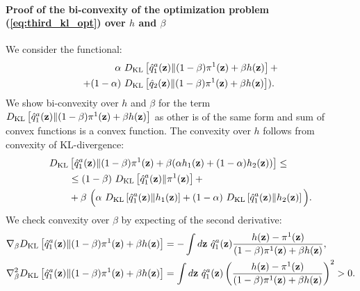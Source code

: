 \paragraph{Proof of the bi-convexity of the optimization problem (\ref{eq:third_kl_opt}) over $h$ and $\beta$}
We consider the functional:
\begin{equation}
    \begin{aligned}
     \alpha~&D_{\mathrm{KL}}\left[\hat{q}_{1}^{a}({\mathbf{z}})\|(1-\beta)\pi^{1}({\mathbf{z}})+\beta h({\mathbf{z}})\right] + \\
    + (1-\alpha)~&D_{\mathrm{KL}}\left[\hat{q}_{2}({\mathbf{z}})\|(1-\beta)\pi^{1}({\mathbf{z}})+\beta h({\mathbf{z}})\right]).
    \end{aligned}
\end{equation}
We show bi-convexity over $h$ and $\beta$ for the term $D_{\mathrm{KL}}\left[\hat{q}_{1}^{a}({\mathbf{z}})\|(1-\beta)\pi^{1}({\mathbf{z}})+\beta h({\mathbf{z}})\right]$ as other is of the same form and sum of convex functions is a convex function. The convexity over $h$ follows from convexity of KL-divergence:
\begin{equation}
    \begin{aligned}
     &D_{\mathrm{KL}}\left[\hat{q}_{1}^{a}({\mathbf{z}})\|(1-\beta)\pi^{1}({\mathbf{z}})+\beta(\alpha h_1({\mathbf{z}}) + (1-\alpha)h_2({\mathbf{z}}))\right] \leq \\
   &\quad\quad  \leq  (1-\beta)~D_{\mathrm{KL}}\left[\hat{q}_{1}^{a}({\mathbf{z}})\|\pi^{1}({\mathbf{z}})\right] + \\
   &\quad\quad +  \beta~\Big(\alpha ~D_{\mathrm{KL}}\left[\hat{q}_{1}^{a}({\mathbf{z}})\|h_1({\mathbf{z}})\right] + (1-\alpha)~D_{\mathrm{KL}}\left[\hat{q}_{1}^{a}({\mathbf{z}})\|h_2({\mathbf{z}})\right]\Big).
    \end{aligned}
\end{equation}
We check convexity over $\beta$ by expecting of the second derivative:
\begin{equation*}
    \begin{aligned}
    & \nabla_{\beta} D_{\mathrm{KL}}\left[\hat{q}_{1}^{a}({\mathbf{z}})\|(1-\beta)\pi^{1}({\mathbf{z}})+\beta h({\mathbf{z}})\right] = - \int d{\mathbf{z}}~\hat{q}_{1}^{a}({\mathbf{z}})\frac{h({\mathbf{z}})-\pi^{1}({\mathbf{z}})}{(1-\beta)\pi^{1}({\mathbf{z}})+\beta h({\mathbf{z}})}, \\
    & \nabla^{2}_{\beta}D_{\mathrm{KL}}\left[\hat{q}_{1}^{a}({\mathbf{z}})\|(1-\beta)\pi^{1}({\mathbf{z}})+\beta h({\mathbf{z}})\right] = \int d{\mathbf{z}}~\hat{q}_{1}^{a}({\mathbf{z}}) \left(\frac{h({\mathbf{z}})-\pi^{1}({\mathbf{z}})}{(1-\beta)\pi^{1}({\mathbf{z}})+\beta h({\mathbf{z}})}\right)^2 > 0.
    \end{aligned}
\end{equation*}
